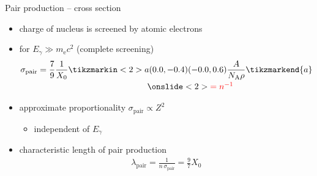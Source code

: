 \documentclass[11pt,xcolor=dvipsnames,professionalfonts]{beamer}
\begin{document}
\begin{frame}{Pair production -- cross section}
	\begin{itemize}
		\setlength\itemsep{1.5em}
		\item charge of nucleus is screened by atomic electrons
		
		\item for $E_\gamma \gg m_\mathrm{e} c^2$ (complete screening)
		\begin{align*}
			\sigma_\mathrm{pair} &= \frac{7}{9} \frac{1}{X_0}
			\begin{array}[t]{@{}c@{}}
				\tikzmarkin<2>{a}(0.0,-0.4)(-0.0,0.6){\dfrac{A}{N_\mathrm{A} \rho}}\tikzmarkend{a}\\[0.8em]
				\onslide<2>{\color{red}{= n^{-1}}}
			\end{array}
		\end{align*}
		\item approximate proportionality $\sigma_\mathrm{pair} \propto Z^2$
		\begin{itemize}
			\item independent of $E_\gamma$
		\end{itemize}
		
		\pause
		
		\item characteristic length of pair production
			\begin{align*}
				\lambda_\mathrm{pair} = \frac{1}{n \, \sigma_\mathrm{pair}} = \frac{9}{7} X_0
			\end{align*}
	\end{itemize}
\end{frame}
\end{document}
